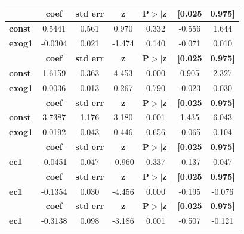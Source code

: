 \begin{center}
\begin{tabular}{lcccccc}
\toprule
                & \textbf{coef} & \textbf{std err} & \textbf{z} & \textbf{P$> |$z$|$} & \textbf{[0.025} & \textbf{0.975]}  \\
\midrule
\textbf{const}  &       0.5441  &        0.561     &     0.970  &         0.332        &       -0.556    &        1.644     \\
\textbf{exog1}  &      -0.0304  &        0.021     &    -1.474  &         0.140        &       -0.071    &        0.010     \\
               & \textbf{coef} & \textbf{std err} & \textbf{z} & \textbf{P$> |$z$|$} & \textbf{[0.025} & \textbf{0.975]}  \\
\midrule
\textbf{const} &       1.6159  &        0.363     &     4.453  &         0.000        &        0.905    &        2.327     \\
\textbf{exog1} &       0.0036  &        0.013     &     0.267  &         0.790        &       -0.023    &        0.030     \\
               & \textbf{coef} & \textbf{std err} & \textbf{z} & \textbf{P$> |$z$|$} & \textbf{[0.025} & \textbf{0.975]}  \\
\midrule
\textbf{const} &       3.7387  &        1.176     &     3.180  &         0.001        &        1.435    &        6.043     \\
\textbf{exog1} &       0.0192  &        0.043     &     0.446  &         0.656        &       -0.065    &        0.104     \\
             & \textbf{coef} & \textbf{std err} & \textbf{z} & \textbf{P$> |$z$|$} & \textbf{[0.025} & \textbf{0.975]}  \\
\midrule
\textbf{ec1} &      -0.0451  &        0.047     &    -0.960  &         0.337        &       -0.137    &        0.047     \\
             & \textbf{coef} & \textbf{std err} & \textbf{z} & \textbf{P$> |$z$|$} & \textbf{[0.025} & \textbf{0.975]}  \\
\midrule
\textbf{ec1} &      -0.1354  &        0.030     &    -4.456  &         0.000        &       -0.195    &       -0.076     \\
             & \textbf{coef} & \textbf{std err} & \textbf{z} & \textbf{P$> |$z$|$} & \textbf{[0.025} & \textbf{0.975]}  \\
\midrule
\textbf{ec1} &      -0.3138  &        0.098     &    -3.186  &         0.001        &       -0.507    &       -0.121     \\

\end{tabular}
\end{center}
